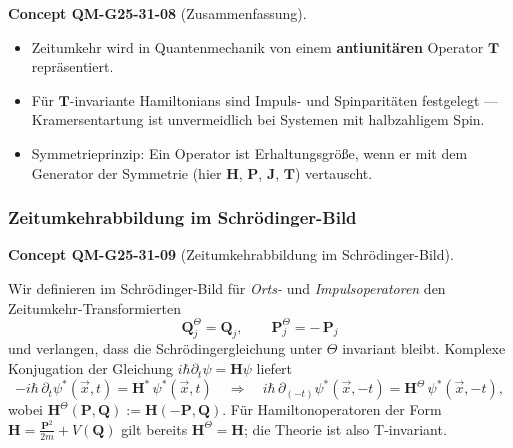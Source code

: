 \documentclass[10pt, letterpaper]{article}
\newcommand{\CustomHeading}[3]{%
  \par\medskip\noindent%
  \textbf{#1 #2} \textnormal{(#3)}.\enskip%
}
\newenvironment{CONC}[2]{\begin{unitbox}\CustomHeading{Concept}{#1}{#2}}{\end{unitbox}}
\begin{document}
\begin{CONC}{QM-G25-31-08}{Zusammenfassung}
\begin{itemize}
  \item Zeitumkehr wird in Quantenmechanik von einem
        \textbf{antiunitären} Operator $\mathbf T$ repräsentiert.
  \item Für $\mathbf T$-invariante Hamiltonians sind
        Impuls- und Spinparitäten festgelegt —\,
        Kramersentartung ist unvermeidlich
        bei Systemen mit halbzahligem Spin.
  \item Symmetrieprinzip:
        Ein Operator ist Erhaltungsgröße, wenn er
        mit dem Generator der Symmetrie
        (hier $\mathbf H$, $\mathbf P$, $\mathbf J$, $\mathbf T$)
        vertauscht.
\end{itemize}
\end{CONC}



\subsubsection*{Zeitumkehrabbildung im Schrödinger-Bild}


\begin{CONC}{QM-G25-31-09}{Zeitumkehrabbildung im Schrödinger-Bild}
Wir definieren im Schrödinger-Bild für \emph{Orts-} und
\emph{Impulsoperatoren} den Zeitumkehr-Transformierten
\[
  \boxed{\;
    \mathbf Q_j^{\Theta} = \mathbf Q_j,
    \qquad
    \mathbf P_j^{\Theta} = -\,\mathbf P_j
  \;}
\]
und verlangen, dass die Schrödingergleichung unter
\(\Theta\) invariant bleibt.  
Komplexe Konjugation der Gleichung
\( i\hbar\partial_t\psi=\mathbf H\psi \)
liefert
\[
  -i\hbar\,\partial_t\psi^{*}(\vec x,t)
  =\mathbf H^{*}\,\psi^{*}(\vec x,t)
  \quad\Longrightarrow\quad
  i\hbar\,\partial_{(-t)}
  \psi^{*}(\vec x,-t)
  =\mathbf H^{\Theta}\,\psi^{*}(\vec x,-t),
\]
wobei
\(
  \mathbf H^{\Theta}(\mathbf P,\mathbf Q)
  :=\mathbf H(-\mathbf P,\mathbf Q).
\)
Für Hamiltonoperatoren der Form
\(
  \mathbf H
  =\frac{\mathbf P^{2}}{2m}+V(\mathbf Q)
\)
gilt bereits
\(\mathbf H^{\Theta}=\mathbf H\);
die Theorie ist also T-invariant.
\end{CONC}

\end{document}
